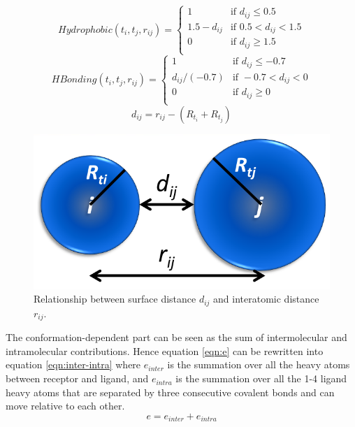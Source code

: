 \begin{equation}
\label{eqn:Hydrophobic}
Hydrophobic(t_i, t_j, r_{ij}) =
\begin{cases}
1 & \text{if } d_{ij} \leq 0.5\\
1.5 - d_{ij} & \text{if } 0.5 < d_{ij} < 1.5\\
0 & \text{if } d_{ij} \geq 1.5\\
\end{cases}
\end{equation}
\begin{equation}
\label{eqn:HBonding}
HBonding(t_i, t_j, r_{ij}) =
\begin{cases}
1 & \text{if } d_{ij} \leq -0.7\\
d_{ij} / (-0.7) & \text{if } -0.7 < d_{ij} < 0\\
0 & \text{if } d_{ij} \geq 0\\
\end{cases}
\end{equation}
\begin{equation}
\label{eqn:dij}
d_{ij} = r_{ij} - (R_{t_i} + R_{t_j})
\end{equation}
\begin{figure}
\centering
\includegraphics[width=\linewidth]{idock/Distance.png}
\caption{Relationship between surface distance $d_{ij}$ and interatomic distance $r_{ij}$.}
\label{idock:Distance}
\end{figure}
The conformation-dependent part can be seen as the sum of intermolecular and intramolecular contributions. Hence equation \eqref{eqn:e} can be rewritten into equation \eqref{eqn:inter-intra} where $e_{inter}$ is the summation over all the heavy atoms between receptor and ligand, and $e_{intra}$ is the summation over all the 1-4 ligand heavy atoms that are separated by three consecutive covalent bonds and can move relative to each other.
\begin{equation}
\label{eqn:inter-intra}
e = e_{inter} + e_{intra}
\end{equation}
